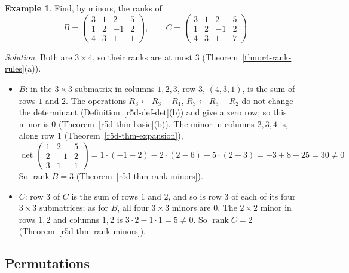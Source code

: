 \documentclass[12pt]{article}
\DeclareMathOperator{\rank}{rank}
\theoremstyle{definition}
\newtheorem{example}[theorem]{Example}
\begin{document}
\begin{example}\label{r5d-exm-rank-minors}
Find, by minors, the ranks of
\[
B=\begin{pmatrix}3&1&2&5\\1&2&-1&2\\4&3&1&1\end{pmatrix},\qquad C=\begin{pmatrix}3&1&2&5\\1&2&-1&2\\4&3&1&7\end{pmatrix}
\]

\textit{Solution.} Both are \(3\times4\), so their ranks are at most \(3\) (Theorem~\ref{thm:r4-rank-rules}(a)).
\begin{itemize}
\item \(B\): in the \(3\times3\) submatrix in columns \(1,2,3\), row \(3\), \((4,3,1)\), is the sum of rows \(1\) and \(2\). The
operations \(R_3\leftarrow R_3-R_1\), \(R_3\leftarrow R_3-R_2\) do not change the determinant (Definition~\ref{r5d-def-det}(b))
and give a zero row; so this minor is \(0\) (Theorem~\ref{r5d-thm-basic}(b)). The minor in columns \(2,3,4\) is, along row
\(1\) (Theorem~\ref{r5d-thm-expansion}),
\[
\det\begin{pmatrix}1&2&5\\2&-1&2\\3&1&1\end{pmatrix}=1\cdot(-1-2)-2\cdot(2-6)+5\cdot(2+3)=-3+8+25=30\ne0
\]
So \(\rank B=3\) (Theorem~\ref{r5d-thm-rank-minors}).
\item \(C\): row \(3\) of \(C\) is the sum of rows \(1\) and \(2\), and so is row \(3\) of each of its four \(3\times3\)
submatrices; as for \(B\), all four \(3\times3\) minors are \(0\). The \(2\times2\) minor in rows \(1,2\) and columns \(1,2\) is
\(3\cdot2-1\cdot1=5\ne0\). So \(\rank C=2\) (Theorem~\ref{r5d-thm-rank-minors}).
\end{itemize}
\end{example}

\subsection*{Permutations}
\end{document}
